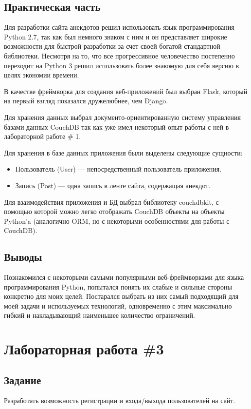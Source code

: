 \documentclass[14pt, a4paper]{extreport}
\begin{document}
\subsection*{Практическая часть}
Для разработки сайта анекдотов решил использовать язык программирования
Python 2.7, так как был немного знаком с ним и он представляет широкие возможности
для быстрой разработки за счет своей богатой стандартной библиотеки.
Несмотря на то, что все прогрессивное человечество постепенно переходит
на Python 3 решил использовать более знакомую для себя версию в целях
экономии времени.

В качестве фреймворка для создания веб-приложений был выбран Flask, который
на первый взгляд показался дружелюбнее, чем Django.

Для хранения данных выбрал документо-ориентированную систему управления базами
данных CouchDB так как уже имел некоторый опыт работы с ней в лабораторной работе
\# 1.

Для хранения в базе данных приложения были выделены следующие сущности:
\begin{itemize}
\item Пользователь (User) --- непосредственный пользователь приложения.
\item Запись (Post) --- одна запись в ленте сайта, содержащая анекдот.
\end{itemize}

Для взаимодействия приложения и БД выбрал библиотеку couchdbkit, с помощью
которой можно легко отображать CouchDB объекты на объекты Python'a
(аналогично ORM, но с некоторыми особенностями для работы с CouchDB).

\subsection*{Выводы}
Познакомился с некоторыми самыми популярными веб-фреймворками для языка программирования
Python, попытался понять их слабые и сильные стороны конкретно для моих целей.
Постарался выбрать из них самый подходящий для моей задачи и используемых технологий,
одновременно с этим максимально гибкий и накладывающий наименьшее количество ограничений.

\section*{Лабораторная работа \#3}
\subsection*{Задание}
Разработать возможность регистрации и входа/выхода пользователей на сайт.
\end{document}
